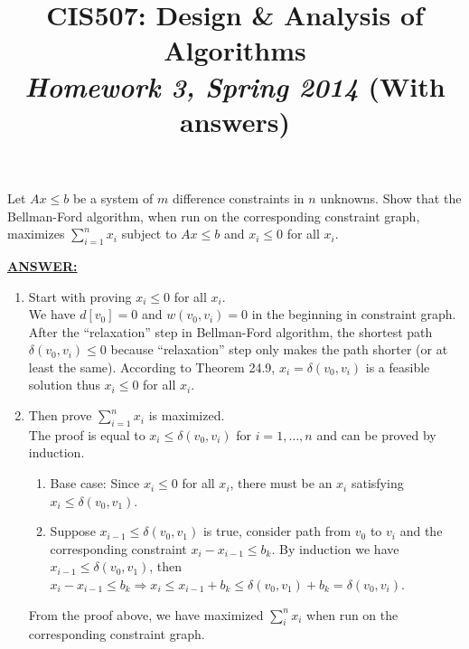 \documentclass{article}
\begin{document}
\title{CIS507: Design \& Analysis of Algorithms\\\emph{Homework 3,
    Spring 2014} (With answers)} 


\date{}

\maketitle

Let $Ax\le b$ be a system of $m$ difference constraints in $n$ unknowns.
 Show that the Bellman-Ford algorithm, when run on the corresponding
 constraint graph, maximizes $\sum_{i=1}^nx_i$ subject to $Ax\le b$
 and $x_i\leq 0$ for all $x_{i}$. 

\medskip
\noindent \underline{\textbf{ANSWER:}}
\begin{enumerate}
\item Start with proving $x_{i}\leq 0$ for all $x_{i}$.\\
  We have $d[v_{0}]=0$ and $w(v_{0},v_{i})=0$ in the beginning in
  constraint graph. After the ``relaxation'' step in Bellman-Ford
  algorithm, the shortest path $\delta(v_{0},v_{i})\leq 0$ because
  ``relaxation'' step only makes the path shorter (or at least the
  same). According to Theorem 24.9, $x_{i}=\delta(v_{0},v_{i})$ is a
  feasible solution thus $x_{i}\leq 0$ for all $x_{i}$.
\item Then prove $\sum_{i=1}^{n}x_{i}$ is maximized.\\
  The proof is equal to $x_{i}\leq \delta(v_{0},v_{i})$ for
  $i=1,\ldots, n$ and can be proved by induction.
  \begin{enumerate}
  \item Base case: Since $x_{i}\leq 0$ for all $x_{i}$, there must be
    an $x_{i}$ satisfying $x_{i}\leq \delta(v_{0},v_{1})$.
  \item Suppose $x_{i-1}\leq \delta(v_{0},v_{1})$ is true, consider
    path from $v_{0}$ to $v_{i}$ and the corresponding constraint
    $x_{i}-x_{i-1}\leq b_{k}$. By induction we have $x_{i-1}\leq
    \delta(v_{0},v_{1})$, then $x_{i}-x_{i-1}\leq b_{k}\Rightarrow
    x_{i}\leq x_{i-1}+b_{k}\leq
    \delta(v_{0},v_{1})+b_{k}=\delta(v_{0},v_{i})$. 
  \end{enumerate}
  From the proof above, we have maximized $\sum_{i}^{n} x_{i}$ when
  run on the corresponding constraint graph.

\end{enumerate}
\end{document}
